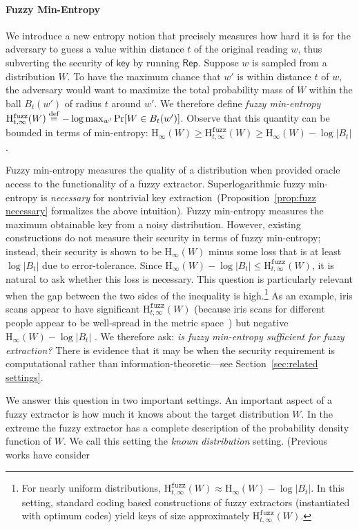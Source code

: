 \documentclass[11pt]{article}
\newcommand{\secref}[1]{\mbox{Section~\ref{#1}}}
\newcommand{\propref}[1]{\mbox{Proposition~\ref{#1}}}
\newcommand{\class}[1]{{\ensuremath{\mathsf{#1}}}}
\newcommand{\key}{\ensuremath{\class{key}}\xspace}
\newcommand{\rep}{\ensuremath{\class{Rep}}\xspace}
\newcommand{\eqdef}{\stackrel{\rm def}{=}}
\newcommand{\Hoo}{\mathrm{H}_\infty}
\newcommand{\Hfuzz}{\mathrm{H}^{\mathtt{fuzz}}_{t,\infty}}
\begin{document}
\paragraph{Fuzzy Min-Entropy}
We introduce a new entropy notion that precisely measures how hard it is for the adversary to guess a value within distance $t$ of the original reading $w$, thus subverting the security of $\key$ by running $\rep$. Suppose $w$ is sampled from a distribution $W$.   To have the maximum chance that $w'$ is within distance $t$ of $w$, the adversary would want to maximize the total probability mass of $W$ within the ball $B_t(w')$ of radius $t$ around $w'$.
We  therefore define \emph{fuzzy min-entropy} $\Hfuzz(W) \eqdef -\log \max_{w'} \Pr[W\in B_t(w')]$.  Observe that this quantity can be bounded in terms of min-entropy: $\Hoo(W) \ge \Hfuzz(W) \ge \Hoo(W)-\log |B_t|$.

Fuzzy min-entropy measures the quality of a distribution when provided oracle access to the functionality of a fuzzy extractor.  Superlogarithmic fuzzy min-entropy  is \emph{necessary} for nontrivial key extraction~(\propref{prop:fuzz necessary} formalizes the above intuition).  Fuzzy min-entropy measures the maximum obtainable key from a noisy distribution.  
However, existing constructions do not measure their security in terms of fuzzy min-entropy; instead, their security is shown to be  $\Hoo(W)$ minus some loss that is at least $\log |B_t|$ due to error-tolerance. Since $\Hoo(W)-\log |B_t| \le \Hfuzz(W)$, it is natural to ask whether this loss is necessary. This question is particularly relevant when the gap between the two sides of the inequality is high.\footnote{For nearly uniform distributions, $\Hfuzz(W) \approx \Hoo(W)- \log |B_t|$.  In this setting, standard coding based constructions of fuzzy extractors (instantiated with optimum codes) yield keys of size approximately $\Hfuzz(W)$.}  As an example, iris scans appear to have significant $\Hfuzz(W)$ (because iris scans for different people appear to be well-spread in the metric space~\cite{daugman2006probing}) but negative $\Hoo(W) -\log |B_t|$ \cite[Section 5]{blanton2009biometric}. We therefore ask: \emph{is fuzzy min-entropy sufficient for fuzzy extraction?} There is evidence that it may be when the security requirement is computational rather than information-theoretic---see \secref{sec:related settings}. 

We answer this question in two important settings.  An important aspect of a fuzzy extractor is how much it knows about the target distribution $W$.  In the extreme the fuzzy extractor has a complete description of the probability density function of $W$.  We call this setting the \emph{known distribution} setting.  (Previous works have consider
\end{document}
